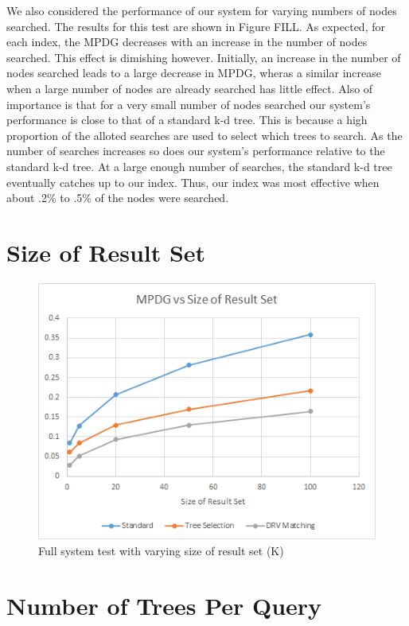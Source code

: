 We also considered the performance of our system for varying numbers of nodes searched.  The results for this test are shown in Figure FILL.  As expected, for each index, the MPDG decreases with an increase in the number of nodes searched.  This effect is dimishing however.  Initially, an increase in the number of nodes searched leads to a large decrease in MPDG, wheras a similar increase when a large number of nodes are already searched has little effect.  Also of importance is that for a very small number of nodes searched our system's performance is close to that of a standard k-d tree.  This is because a high proportion of the alloted searches are used to select which trees to search.  As the number of searches increases so does our system's performance relative to the standard k-d tree.  At a large enough number of searches, the standard k-d tree eventually catches up to our index.  Thus, our index was most effective when about .2\% to .5\% of the nodes were searched.

\section{Size of Result Set}

\begin{figure}[h]
\begin{center}
\includegraphics[width=.85\textwidth]{Figures/k}
\end{center}
\caption{Full system test with varying size of result set (K)}
\label{fig:kparam}
\end{figure}

\section{Number of Trees Per Query}

